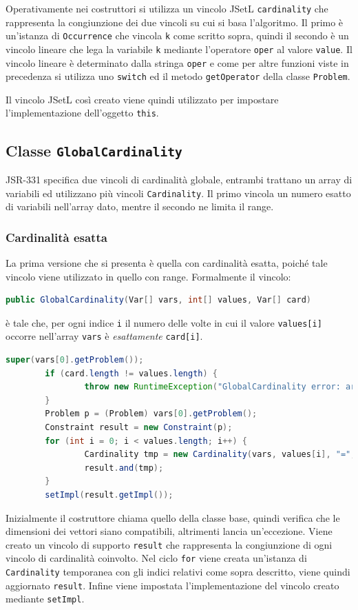 Operativamente nei costruttori si utilizza un vincolo JSetL 
\texttt{cardinality} che rappresenta la congiunzione dei due vincoli su cui
si basa l'algoritmo. Il primo è un'istanza di \texttt{Occurrence} che vincola
\texttt{k} come scritto sopra, quindi il secondo è un vincolo lineare che
lega la variabile \texttt{k} mediante l'operatore \texttt{oper} al valore
\texttt{value}. Il vincolo lineare è determinato dalla stringa \texttt{oper}
e come per altre funzioni viste in precedenza si utilizza uno \texttt{switch}
ed il metodo \texttt{getOperator} della classe \texttt{Problem}.

Il vincolo JSetL così creato viene quindi utilizzato per impostare 
l'implementazione dell'oggetto \texttt{this}.

\subsection{Classe \texttt{GlobalCardinality}}\label{GlobalCardinality}
JSR-331 specifica due vincoli di cardinalità globale, entrambi
trattano un array di variabili ed utilizzano più vincoli 
\texttt{Cardinality}. Il primo vincola un numero esatto di variabili nell'array
dato, mentre il secondo ne limita il range.
\subsubsection*{Cardinalità esatta}
La prima versione che si presenta è quella con cardinalità esatta, poiché tale
vincolo viene utilizzato in quello con range.
Formalmente il vincolo:
\begin{lstlisting}[language = Java, frame = single]
public GlobalCardinality(Var[] vars, int[] values, Var[] card)
\end{lstlisting}
è tale che, per ogni indice \texttt{i} il numero delle volte in cui il valore
\texttt{values[i]} occorre nell'array \texttt{vars} è \emph{esattamente}
\texttt{card[i]}.
\begin{lstlisting}[language = Java,
                   caption = {corpo del costruttore.}]
        super(vars[0].getProblem());
        if (card.length != values.length) {
                throw new RuntimeException("GlobalCardinality error: arrays values and cardinalityVars do not have same size");
        }
        Problem p = (Problem) vars[0].getProblem();
        Constraint result = new Constraint(p);
        for (int i = 0; i < values.length; i++) {
                Cardinality tmp = new Cardinality(vars, values[i], "=", card[i]);
                result.and(tmp);
        }
        setImpl(result.getImpl());
\end{lstlisting}
Inizialmente il costruttore chiama quello della classe base, quindi verifica che
le dimensioni dei vettori siano compatibili, altrimenti lancia un'eccezione.
Viene creato un vincolo di supporto \texttt{result} che rappresenta la
congiunzione di ogni vincolo di cardinalità coinvolto. Nel ciclo 
\texttt{for} viene creata un'istanza di \texttt{Cardinality} temporanea con gli 
indici relativi come sopra descritto, viene quindi aggiornato \texttt{result}. 
Infine viene impostata l'implementazione del vincolo creato mediante 
\texttt{setImpl}.
